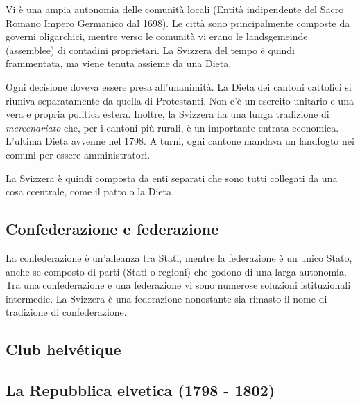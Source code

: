 \documentclass[a4paper]{article}
\begin{document}
Vi è una ampia autonomia delle comunità locali (Entità indipendente del Sacro Romano Impero Germanico dal 1698).
Le città sono principalmente composte da governi oligarchici, mentre verso le comunità
vi erano le landsgemeinde (assemblee) di contadini proprietari.
La Svizzera del tempo è quindi frammentata, ma viene tenuta assieme da una Dieta.

Ogni decisione doveva essere presa all'unanimità.
La Dieta dei cantoni cattolici si riuniva separatamente da quella di Protestanti.
Non c'è un esercito unitario e una vera e propria politica estera.
Inoltre, la Svizzera ha una lunga tradizione di \textit{mercenariato} che, per i cantoni più rurali,
è un importante entrata economica.
L'ultima Dieta avvenne nel 1798.
A turni, ogni cantone mandava un landfogto nei comuni per essere amministratori.

La Svizzera è quindi composta da enti separati che sono tutti collegati da una cosa ccentrale, come il patto o la Dieta.

\subsection{Confederazione e federazione}

La confederazione è un'alleanza tra Stati, mentre la federazione è un unico Stato,
anche se composto di parti (Stati o regioni) che godono di una larga autonomia.
Tra una confederazione e una federazione vi sono numerose soluzioni istituzionali intermedie.
La Svizzera è una federazione nonostante sia rimasto il nome di tradizione di confederazione.

\subsection{Club helvétique}


\subsection{La Repubblica elvetica (1798 - 1802)}
\end{document}
